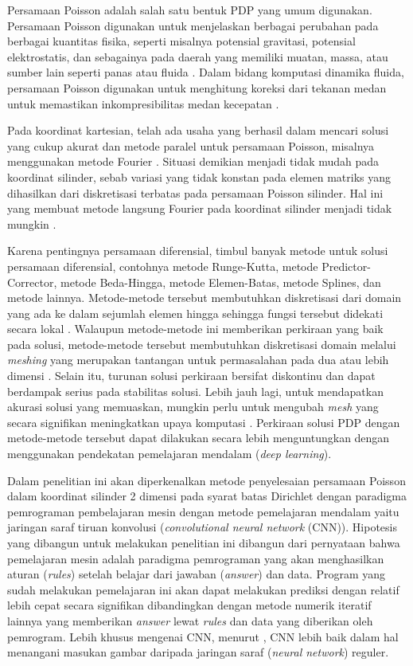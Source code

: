 Persamaan Poisson adalah salah satu bentuk PDP yang umum digunakan. Persamaan Poisson
digunakan untuk menjelaskan berbagai perubahan pada berbagai kuantitas fisika,
seperti misalnya potensial gravitasi, potensial elektrostatis, dan sebagainya
pada daerah yang memiliki muatan, massa, atau sumber lain seperti panas atau
fluida \citep{boas_2006_mathematical}. Dalam bidang komputasi dinamika fluida, persamaan
Poisson digunakan untuk menghitung koreksi dari tekanan medan untuk memastikan inkompresibilitas
medan kecepatan \citep{Ozbay2021}.

Pada koordinat kartesian, telah ada usaha yang berhasil dalam mencari solusi yang
cukup akurat dan metode paralel untuk persamaan Poisson, misalnya menggunakan
metode Fourier \citep{cohl_1999}. Situasi demikian menjadi tidak mudah pada
koordinat silinder, sebab variasi yang tidak konstan pada elemen matriks yang dihasilkan
dari diskretisasi terbatas pada persamaan Poisson silinder. Hal ini yang membuat
metode langsung Fourier pada koordinat silinder menjadi tidak mungkin \citep{cohl_1999}.

Karena pentingnya persamaan diferensial, timbul banyak metode untuk solusi
persamaan diferensial, contohnya metode Runge-Kutta, metode Predictor- Corrector,
metode Beda-Hingga, metode Elemen-Batas, metode Splines, dan metode lainnya.
Metode-metode tersebut membutuhkan diskretisasi dari domain yang ada ke dalam
sejumlah elemen hingga sehingga fungsi tersebut didekati secara lokal \citep{kumar_yadav_2011}.
Walaupun metode-metode ini memberikan perkiraan yang baik pada solusi, metode-metode
tersebut membutuhkan diskretisasi domain melalui \emph{meshing} yang merupakan
tantangan untuk permasalahan pada dua atau lebih dimensi \citep{kumar_yadav_2011}.
Selain itu, turunan solusi perkiraan bersifat diskontinu dan dapat berdampak serius
pada stabilitas solusi. Lebih jauh lagi, untuk mendapatkan akurasi solusi yang memuaskan,
mungkin perlu untuk mengubah \emph{mesh} yang secara signifikan meningkatkan upaya
komputasi \citep{kumar_yadav_2011}. Perkiraan solusi PDP dengan metode-metode tersebut
dapat dilakukan secara lebih menguntungkan dengan menggunakan pendekatan pemelajaran
mendalam (\emph{deep learning}).

Dalam penelitian ini akan diperkenalkan metode penyelesaian persamaan Poisson
dalam koordinat silinder 2 dimensi pada syarat batas Dirichlet dengan paradigma
pemrograman pembelajaran mesin dengan metode pemelajaran mendalam yaitu jaringan
saraf tiruan konvolusi (\emph{convolutional neural network} (CNN)). Hipotesis
yang dibangun untuk melakukan penelitian ini dibangun dari pernyataan
\cite{moroney_2022} bahwa pemelajaran mesin adalah paradigma pemrograman yang
akan menghasilkan aturan (\emph{rules}) setelah belajar dari jawaban (\emph{answer})
dan data. Program yang sudah melakukan pemelajaran ini akan dapat melakukan prediksi
dengan relatif lebih cepat secara signifikan dibandingkan dengan metode numerik iteratif
lainnya yang memberikan \emph{answer} lewat \emph{rules} dan data yang diberikan
oleh pemrogram. Lebih khusus mengenai CNN, menurut \cite{Li_Li_Gao}, CNN lebih
baik dalam hal menangani masukan gambar daripada jaringan saraf (\emph{neural
network}) reguler.

